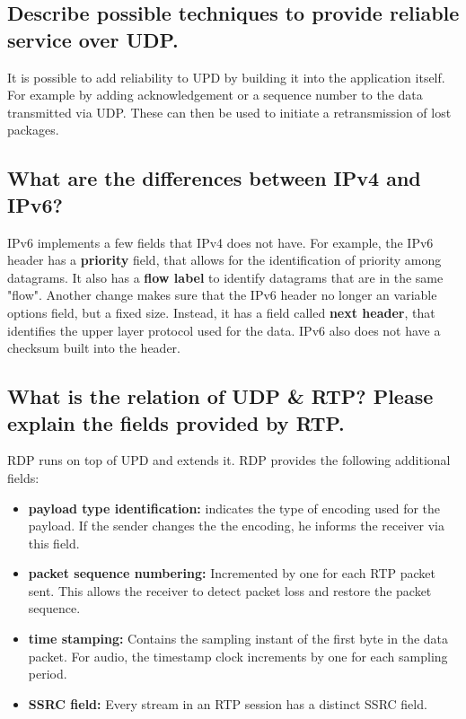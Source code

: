 \documentclass[a4paper,12pt]{article}
\begin{document}
\subsection{Describe possible techniques to provide reliable service over UDP.}
It is possible to add reliability to UPD by building it into the application itself.
For example by adding acknowledgement or a sequence number to the data transmitted via UDP.
These can then be used to initiate a retransmission of lost packages.

\subsection{What are the differences between IPv4 and IPv6?}
IPv6 implements a few fields that IPv4 does not have.
For example, the IPv6 header has a \textbf{priority} field, that allows for the identification of priority among datagrams.
It also has a \textbf{flow label} to identify datagrams that are in the same "flow".
Another change makes sure that the IPv6 header no longer an variable options field, but a fixed size.
Instead, it has a field called \textbf{next header}, that identifies the upper layer protocol used for the data.
IPv6 also does not have a checksum built into the header.

\subsection{What is the relation of UDP \& RTP? Please explain the fields provided by RTP.}
RDP runs on top of UPD and extends it.
RDP provides the following additional fields:
\begin{itemize}
    \item \textbf{payload type identification:}
	indicates the type of encoding used for the payload.
	If the sender changes the the encoding, he informs the receiver via this field.
    \item \textbf{packet sequence numbering:}
	Incremented by one for each RTP packet sent.
	This allows the receiver to detect packet loss and restore the packet sequence.
    \item \textbf{time stamping:}
	Contains the sampling instant of the first byte in the data packet.
	For audio, the timestamp clock increments by one for each sampling period.
    \item \textbf{SSRC field:}
	Every stream in an RTP session has a distinct SSRC field.
\end{itemize}
\end{document}
